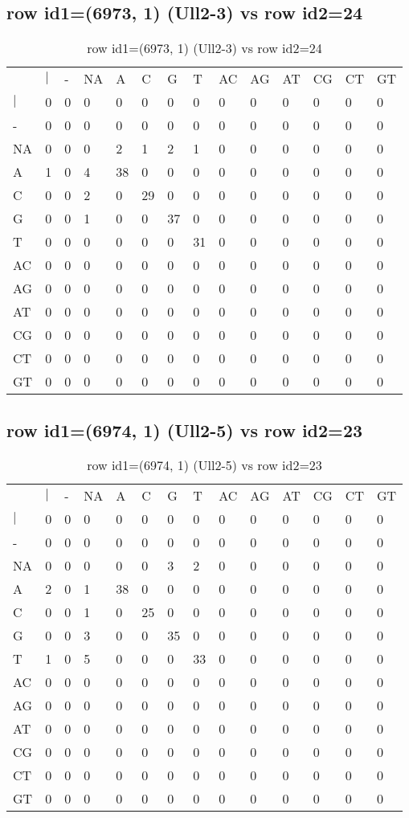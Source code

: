 \subsection{row id1=(6973, 1) (Ull2-3) vs row id2=24}
\begin{center}
\begin{longtable}{|l|l|l|l|l|l|l|l|l|l|l|l|l|l|}
\caption{row id1=(6973, 1) (Ull2-3) vs row id2=24} \label{table_dm188}\\
\hline
\\
\hline
&$|$&-&NA&A&C&G&T&AC&AG&AT&CG&CT&GT\\
$|$&0&0&0&0&0&0&0&0&0&0&0&0&0\\
-&0&0&0&0&0&0&0&0&0&0&0&0&0\\
NA&0&0&0&2&1&2&1&0&0&0&0&0&0\\
A&1&0&4&38&0&0&0&0&0&0&0&0&0\\
C&0&0&2&0&29&0&0&0&0&0&0&0&0\\
G&0&0&1&0&0&37&0&0&0&0&0&0&0\\
T&0&0&0&0&0&0&31&0&0&0&0&0&0\\
AC&0&0&0&0&0&0&0&0&0&0&0&0&0\\
AG&0&0&0&0&0&0&0&0&0&0&0&0&0\\
AT&0&0&0&0&0&0&0&0&0&0&0&0&0\\
CG&0&0&0&0&0&0&0&0&0&0&0&0&0\\
CT&0&0&0&0&0&0&0&0&0&0&0&0&0\\
GT&0&0&0&0&0&0&0&0&0&0&0&0&0\\
\hline
\end{longtable}
\end{center}

\subsection{row id1=(6974, 1) (Ull2-5) vs row id2=23}
\begin{center}
\begin{longtable}{|l|l|l|l|l|l|l|l|l|l|l|l|l|l|}
\caption{row id1=(6974, 1) (Ull2-5) vs row id2=23} \label{table_dm190}\\
\hline
\\
\hline
&$|$&-&NA&A&C&G&T&AC&AG&AT&CG&CT&GT\\
$|$&0&0&0&0&0&0&0&0&0&0&0&0&0\\
-&0&0&0&0&0&0&0&0&0&0&0&0&0\\
NA&0&0&0&0&0&3&2&0&0&0&0&0&0\\
A&2&0&1&38&0&0&0&0&0&0&0&0&0\\
C&0&0&1&0&25&0&0&0&0&0&0&0&0\\
G&0&0&3&0&0&35&0&0&0&0&0&0&0\\
T&1&0&5&0&0&0&33&0&0&0&0&0&0\\
AC&0&0&0&0&0&0&0&0&0&0&0&0&0\\
AG&0&0&0&0&0&0&0&0&0&0&0&0&0\\
AT&0&0&0&0&0&0&0&0&0&0&0&0&0\\
CG&0&0&0&0&0&0&0&0&0&0&0&0&0\\
CT&0&0&0&0&0&0&0&0&0&0&0&0&0\\
GT&0&0&0&0&0&0&0&0&0&0&0&0&0\\
\hline
\end{longtable}
\end{center}


